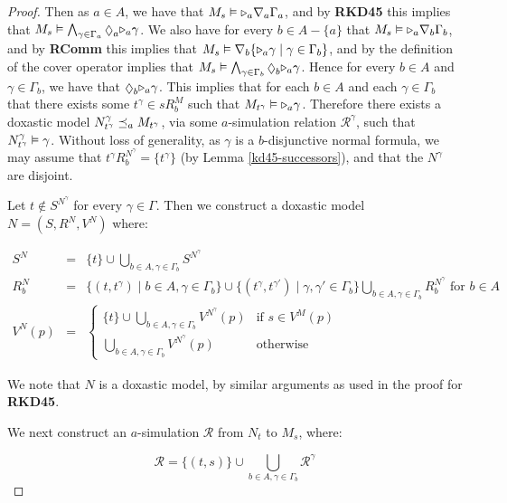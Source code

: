 \begin{proof}
Then as $a \in A$, we have that $M_s \vDash {\ensuremath{\mathopen{\triangleright}}}_a \nabla_a \Gamma_a$,
and by {\bf RKD45} this implies that $M_s \entails \bigwedge_{\gamma \in
\Gamma_a} \suspects_a \somerefs_a \gamma$. We also have for every $b \in A -
\{a\}$ that $M_s \vDash {\ensuremath{\mathopen{\triangleright}}}_a \nabla_b \Gamma_b$, and by {\bf RComm}
this implies that $M_s \vDash \nabla_b \{{\mathopen{\triangleright}}_a \gamma \mid \gamma \in
\Gamma_b\}$, and by the definition of the cover operator implies that $M_s
\entails \bigwedge_{\gamma \in \Gamma_b} \suspects_b \somerefs_a \gamma$.  Hence
for every $b \in A$ and $\gamma \in \Gamma_b$, we have that $\suspects_b
\somerefs_a \gamma$. This implies that for each $b \in A$ and each $\gamma \in
\Gamma_b$ that there exists some $t^{\gamma} \in sR^M_b$ such that $M_{t^\gamma}
\vDash {\ensuremath{\mathopen{\triangleright}}}_a \gamma$. Therefore there exists a doxastic model
$N^\gamma_{t^\gamma} \preceq_a M_{t^\gamma}$, via some $a$-simulation
relation $\mathcal{R}^\gamma$, such that $N^\gamma_{t^\gamma} \vDash \gamma$.
Without loss of generality, as $\gamma$ is a $b$-disjunctive normal formula, we
may assume that $t^\gamma R^{N^\gamma}_b = \{t^\gamma\}$ (by Lemma
\ref{kd45-successors}), and that the $N^\gamma$ are disjoint.

Let $t \notin S^{N^\gamma}$ for every $\gamma \in \Gamma$.
Then we construct a doxastic model $N = (S, R^N, V^N)$ where:

\begin{eqnarray*}
S^N &=& \{t\} \cup \bigcup_{b \in A, \gamma \in \Gamma_b} S^{N^\gamma}\\
R^N_b &=& \{(t, t^{\gamma}) \mid b \in A, \gamma \in \Gamma_b\} 
\cup \{(t^\gamma, t^{\gamma'}) \mid \gamma, \gamma' \in \Gamma_b\}
\bigcup_{b \in A, \gamma \in \Gamma_b} R^{N^\gamma}_b \text{ for $b \in A$}\\
V^N(p) &=& 
\begin{cases}
\{t\} \cup \bigcup_{b \in A, \gamma \in \Gamma_b} V^{N^\gamma}(p) & \text{if $s
\in V^M(p)$}\\
\bigcup_{b \in A, \gamma \in \Gamma_b} V^{N^\gamma}(p) & \text{otherwise}
\end{cases}
\end{eqnarray*}

We note that $N$ is a doxastic model, by similar arguments as used in the proof
for {\bf RKD45}.

We next construct an $a$-simulation $\mathcal{R}$ from $N_t$ to $M_s$, where:

$$\mathcal{R} = \{(t, s)\} \cup \bigcup_{b \in A, \gamma \in \Gamma_b}
\mathcal{R}^\gamma$$


\end{proof}
